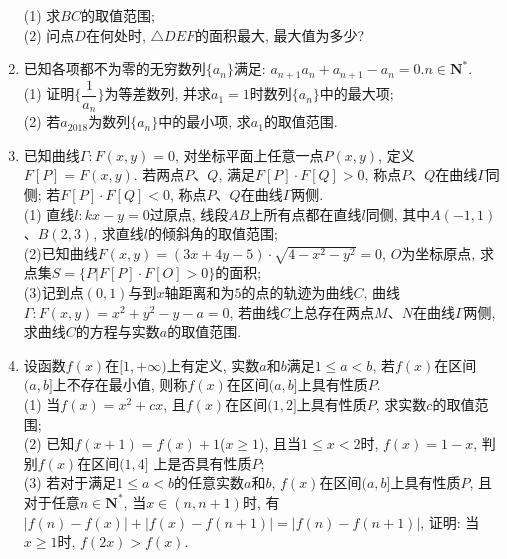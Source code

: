\documentclass[10pt,a4paper]{article}
\begin{document}
\begin{enumerate}[1.]
\begin{center}
\begin{tikzpicture}
    \end{tikzpicture}
\end{center}
(1) 求$BC$的取值范围;\\
(2) 问点$D$在何处时, $\triangle DEF$的面积最大, 最大值为多少?
\item 已知各项都不为零的无穷数列$\{a_n\}$满足: ${a_{n+1}}a_n+{a_{n+1}}-a_n=0$.$n\in \mathbf{N}^*$.\\
(1) 证明$\{\dfrac 1{a_n}\}$为等差数列, 并求$a_1=1$时数列$\{a_n\}$中的最大项;\\
(2) 若$a_{2018}$为数列$\{a_n\}$中的最小项, 求$a_1$的取值范围.
\item 已知曲线$\Gamma:F(x,y)=0$, 对坐标平面上任意一点$P(x,y)$, 定义$F[P]=F(x,y)$. 若两点$P$、$Q$, 满足$F[P]\cdot F[Q]>0$, 称点$P$、$Q$在曲线$\Gamma$同侧; 若$F[P]\cdot F[Q]<0$, 称点$P$、$Q$在曲线$\Gamma$两侧.\\
(1) 直线$l:kx-y=0$过原点, 线段$AB$上所有点都在直线$l$同侧, 其中$A(-1,1)$、$B(2,3)$, 求直线$l$的倾斜角的取值范围;\\
(2)已知曲线$F(x,y)=(3x+4y-5)\cdot \sqrt{4-x^2-y^2}=0$, $O$为坐标原点, 求点集$S=\{P|F[P]\cdot F[O]>0\}$的面积;\\
(3)记到点$(0,1)$与到$x$轴距离和为$5$的点的轨迹为曲线$C$, 曲线$\Gamma :F(x,y)=x^2+y^2-y-a=0$, 若曲线$C$上总存在两点$M$、$N$在曲线$\Gamma$两侧, 求曲线$C$的方程与实数$a$的取值范围.
\item 设函数$f(x)$在$[1,+\infty)$上有定义, 实数$a$和$b$满足$1\le a<b$, 若$f(x)$在区间$(a,b]$上不存在最小值, 则称$f(x)$在区间$(a,b]$上具有性质$P$.\\
(1) 当$f(x)=x^2+cx$, 且$f(x)$在区间$(1,2]$上具有性质$P$, 求实数$c$的取值范围;\\
(2) 已知$f(x+1)=f(x)+1$($x\ge 1$), 且当$1\le x<2$时, $f(x)=1-x$, 判别$f(x)$在区间$(1,4]$ 上是否具有性质$P$;\\
(3) 若对于满足$1\le a<b$的任意实数$a$和$b$, $f(x)$在区间$(a,b]$上具有性质$P$, 且对于任意$n\in \mathbf{N}^*$, 当$x\in (n,n+1)$时, 有$|f(n)-f(x)|+|f(x)-f(n+1)|=|f(n)-f(n+1)|$, 证明: 当$x\ge 1$时, $f(2x)>f(x)$.


\end{enumerate}
\end{document}
